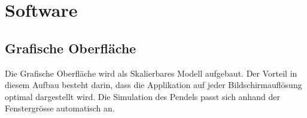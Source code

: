 \documentclass[12pt]{article}
\begin{document}
\newpage
\section{Software}
\subsection{Grafische Oberfläche}
Die Grafische Oberfläche wird als Skalierbares Modell aufgebaut. Der Vorteil in diesem Aufbau besteht darin, dass die Applikation auf jeder Bildschirmauflösung optimal dargestellt wird. Die Simulation des Pendels passt sich anhand der Fenstergrösse automatisch an.

\newpage


\end{document}
